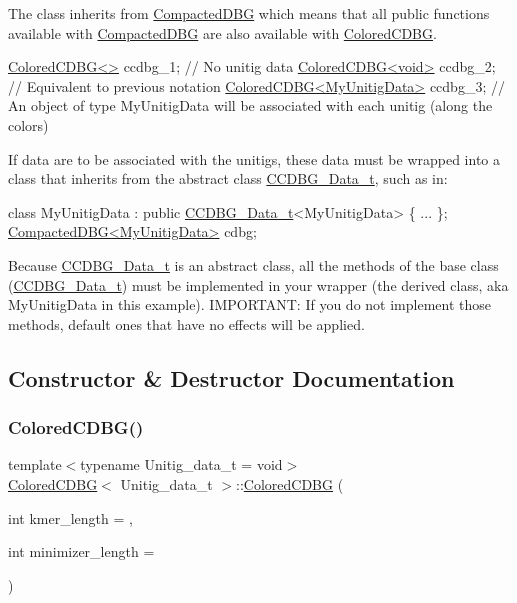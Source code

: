 The class inherits from \hyperlink{classCompactedDBG}{Compacted\+D\+BG} which means that all public functions available with \hyperlink{classCompactedDBG}{Compacted\+D\+BG} are also available with \hyperlink{classColoredCDBG}{Colored\+C\+D\+BG}. 
\begin{DoxyCode}
\hyperlink{classColoredCDBG}{ColoredCDBG<>} ccdbg\_1; \textcolor{comment}{// No unitig data}
\hyperlink{classColoredCDBG}{ColoredCDBG<void>} ccdbg\_2; \textcolor{comment}{// Equivalent to previous notation}
\hyperlink{classColoredCDBG}{ColoredCDBG<MyUnitigData>} ccdbg\_3; \textcolor{comment}{// An object of type MyUnitigData will be
       associated with each unitig (along the colors)}
\end{DoxyCode}
 If data are to be associated with the unitigs, these data must be wrapped into a class that inherits from the abstract class \hyperlink{classCCDBG__Data__t}{C\+C\+D\+B\+G\+\_\+\+Data\+\_\+t}, such as in\+: 
\begin{DoxyCode}
\textcolor{keyword}{class }MyUnitigData : \textcolor{keyword}{public} \hyperlink{classCCDBG__Data__t}{CCDBG\_Data\_t}<MyUnitigData> \{ ... \};
\hyperlink{classCompactedDBG}{CompactedDBG<MyUnitigData>} cdbg;
\end{DoxyCode}
 Because \hyperlink{classCCDBG__Data__t}{C\+C\+D\+B\+G\+\_\+\+Data\+\_\+t} is an abstract class, all the methods of the base class (\hyperlink{classCCDBG__Data__t}{C\+C\+D\+B\+G\+\_\+\+Data\+\_\+t}) must be implemented in your wrapper (the derived class, aka My\+Unitig\+Data in this example). I\+M\+P\+O\+R\+T\+A\+NT\+: If you do not implement those methods, default ones that have no effects will be applied. 

\subsection{Constructor \& Destructor Documentation}
\mbox{\label{classColoredCDBG_aec6b5eb64fc7086bf81107849847071d}} 
\subsubsection{\texorpdfstring{Colored\+C\+D\+B\+G()}{ColoredCDBG()}\hspace{0.1cm}{\footnotesize\ttfamily [1/3]}}
{\footnotesize\ttfamily template$<$typename Unitig\+\_\+data\+\_\+t = void$>$ \\
\hyperlink{classColoredCDBG}{Colored\+C\+D\+BG}$<$ Unitig\+\_\+data\+\_\+t $>$\+::\hyperlink{classColoredCDBG}{Colored\+C\+D\+BG} (\begin{DoxyParamCaption}\item[{int}]{kmer\+\_\+length = {},  }\item[{int}]{minimizer\+\_\+length = {} }\end{DoxyParamCaption})}



